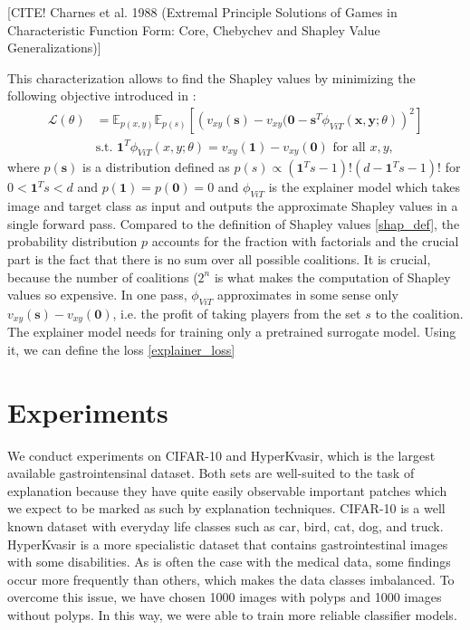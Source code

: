 \documentclass[magisterska,en]{pracamgr}
\begin{document}
[CITE! Charnes et al. 1988 (Extremal Principle Solutions of Games in Characteristic Function Form: Core, Chebychev and Shapley Value Generalizations)]

This characterization allows to find the Shapley values by minimizing the following objective introduced in \cite{DBLP:conf/iclr/JethaniSCLR22}:
\begin{equation}
    \begin{split}
        \mathcal{L}(\theta) &= \mathbb{E}_{p(x,y)} \mathbb{E}_{p(s)}  \left[\left(v_{xy}(\mathbf{s})-v_{xy}(\mathbf{0} -\mathbf{s}^T \phi _{ViT}(\mathbf{x},\mathbf{y};\theta)\right)^2\right]
        \\
        &    \textrm{s.t.  } \mathbf{1}^T \phi _{ViT}(x,y;\theta) = v_{xy}(\mathbf{1}) - v_{xy}(\mathbf{0}) \textrm{    for all   } x,y,
    \end{split}
\end{equation}\label{explainer_loss}
where $p(\mathbf{s})$ is a distribution defined as $p(s) \propto (\mathbf{1}^Ts - 1)! (d - \mathbf{1}^Ts -1)!$ for $0 < \mathbf{1}^Ts < d$ and $p(\mathbf{1}) = p(\mathbf{0}) = 0$ and $\phi _{ViT}$ is the explainer model which takes image and target class as input and outputs the approximate Shapley values in a single forward pass. Compared to the definition of Shapley values \ref{shap_def}, the probability distribution $p$ accounts for the fraction with factorials and the crucial part is the fact that there is no sum over all possible coalitions. It is crucial, because the number of coalitions ($2^n$ is what makes the computation of Shapley values so expensive. In one pass, $\phi _{ViT}$ approximates in some sense only $v_{xy}(\mathbf{s})-v_{xy}(\mathbf{0})$, i.e. the profit of taking players from the set $s$ to the coalition. The explainer model needs for training only a pretrained surrogate model. Using it, we can define the loss \ref{explainer_loss}




\chapter{Experiments}\label{r:experiments}
We conduct experiments on CIFAR-10 and HyperKvasir, which is the largest available gastrointensinal dataset. Both sets are well-suited to the task of explanation because they have quite easily observable important patches which we expect to be marked as such by explanation techniques. CIFAR-10 is a well known dataset with everyday life classes such as car, bird, cat, dog, and truck.
HyperKvasir is a more specialistic dataset that contains gastrointestinal images with some disabilities.
As is often the case with the medical data, some findings occur more frequently than others, which makes the data classes imbalanced. To overcome this issue, we have chosen 1000 images with polyps and 1000 images without polyps. In this way, we were able to train more reliable classifier models.
\end{document}
